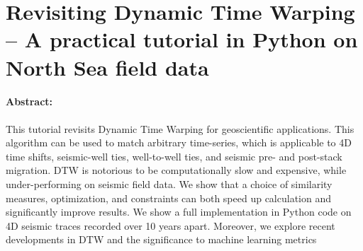 \section[Dynamic Time Warping Tutorial Paper]{Revisiting Dynamic Time Warping -- A practical tutorial in Python on North Sea field data}

\paragraph{Abstract:} This tutorial revisits Dynamic Time Warping for geoscientific applications.  This algorithm can be used to match arbitrary time-series, which is applicable to 4D time shifts, seismic-well ties, well-to-well ties, and seismic pre- and post-stack migration.  DTW is notorious to be computationally slow and expensive, while under-performing on seismic field data.  We show that a choice of similarity measures, optimization, and constraints can both speed up calculation and significantly improve results.  We show a full implementation in Python code on 4D seismic traces recorded over 10 years apart. Moreover, we explore recent developments in DTW and the significance to machine learning metrics

{\vfill\hfill\newline{}}


